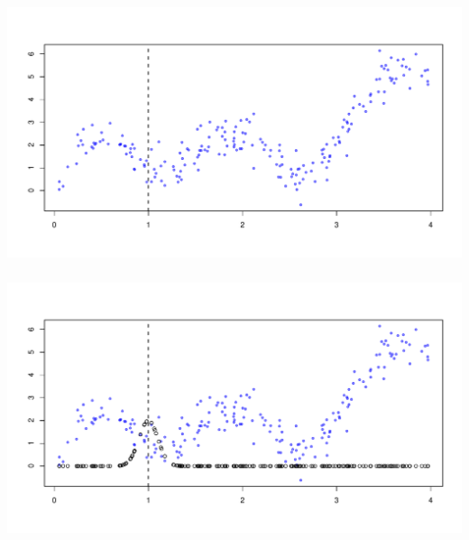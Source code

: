 \documentclass[xetex,mathserif,serif,aspectratio=169]{beamer}
\begin{document}
\begin{frame}[fragile] \frametitle{} \oldB \small

\begin{center}
\includegraphics[width=\textwidth]{img/ksmooth1.pdf}
\end{center}

\end{frame}

\begin{frame}[fragile] \frametitle{} \oldB \small

\begin{center}
\includegraphics[width=\textwidth]{img/ksmooth2.pdf}
\end{center}

\end{frame}
\end{document}
